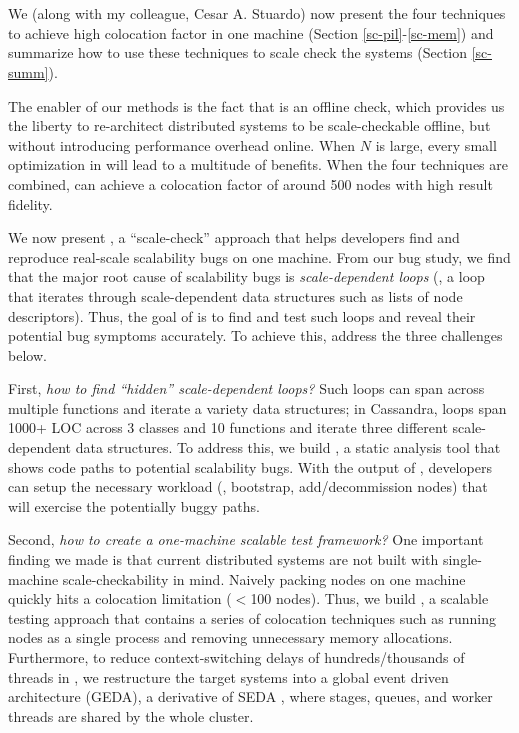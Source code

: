 \section{\sck}
\label{sec-sck-sck}

We (along with my colleague, Cesar A. Stuardo) now present the four \sck
techniques to achieve high colocation factor in one machine (Section
\ref{sc-pil}-\ref{sc-mem}) and summarize how to use these techniques to scale
check the systems (Section \ref{sc-summ}).

The enabler of our methods is the fact that \sck is an offline check, which
provides us the liberty to re-architect distributed systems to be
scale-checkable offline, but without introducing performance overhead online.
%
When $N$ is large, every small optimization in \sck will lead to a multitude of
benefits.
%
When the four techniques are combined, \sck can achieve a colocation factor of
around 500 nodes with high result fidelity.




\fi

We now present \sck, a ``scale-check'' approach that helps
developers find and reproduce real-scale scalability bugs on one machine.
%
From our bug study, we find that the major root cause of scalability bugs
is {\em scale-dependent loops} (\eg, a \oonnn loop that iterates through
scale-dependent data structures such as lists of node descriptors).
%
Thus, the goal of \sck is to find and test such loops and reveal their
potential bug symptoms accurately.
%
To achieve this, \sck address the three challenges below.


First, {\em how to find ``hidden'' scale-dependent loops?}  Such loops can 
span across multiple functions and iterate a variety data structures; in
Cassandra, \oonnn loops span 1000+ LOC across 3 classes and 10 functions
and iterate three different scale-dependent data structures.
%
To address this, we build \sfind, a static analysis tool that shows code
paths to potential scalability bugs.  With the output of \sfind,
developers can setup the necessary workload (\eg, bootstrap,
add/decommission nodes) that will exercise the potentially buggy paths.

Second, {\em how to create a one-machine scalable test framework?}  One 
important finding we made is that current distributed systems are not 
built with single-machine scale-checkability in mind.  Naively packing
nodes on one machine quickly hits a colocation limitation
($<$100 nodes).  Thus, we build \stest, a scalable testing approach that
contains a series of colocation techniques such as running nodes as a
single process and removing unnecessary memory allocations.  Furthermore,
to reduce context-switching delays of hundreds/thousands of threads
in \stest, we restructure the target systems into a global event driven
architecture (GEDA), a derivative of SEDA \cite{Welsh+01-Seda}, where
stages, queues, and worker threads are shared by the whole cluster.

